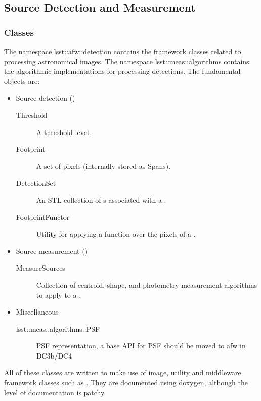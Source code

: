 
\subsection{Source Detection and Measurement}

\subsubsection{Classes}

The namespace lsst::afw::detection contains the framework classes related to 
processing astronomical images. The namespace lsst::meas::algorithms contains
the algorithmic implementations for processing detections.
The fundamental objects are:\begin{itemize}
\item Source detection ()
\begin{description}
    \item[Threshold] A threshold level.
    \item[Footprint] A set of pixels (internally stored as Spans).
    \item[DetectionSet] An STL collection of s associated 
        with a .
    \item[FootprintFunctor] Utility for applying a function over the pixels of
        a .
\end{description}
\item Source measurement ()
\begin{description}
    \item[MeasureSources] Collection of centroid, shape, and photometry 
        measurement algorithms to apply to a .
\end{description}
\item Miscellaneous
\begin{description}
    \item[lsst::meas::algorithms::PSF] PSF representation, a base API for
        PSF should be moved to afw in DC3b/DC4
    \end{description}
\end{itemize}

All of these classes are written to make use of image, utility and middleware
framework classes such as . They are 
documented using doxygen, although the level of documentation is patchy.

